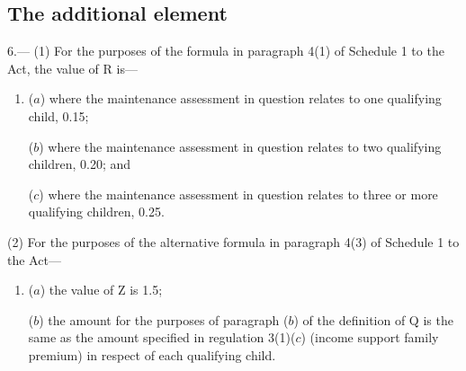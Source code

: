 \documentclass[12pt,a4paper]{article}
\begin{document}
\subsection[6. The additional element]{The additional element}

6.—%
(1) For the purposes of the formula in paragraph 4(1) of Schedule 1 to the Act, the value of R is—
\begin{enumerate}\item[]
($a$) where the maintenance assessment in question relates to one qualifying child, 0.15;

($b$) where the maintenance assessment in question relates to two qualifying children, 0.20; and

($c$) where the maintenance assessment in question relates to three or more qualifying children, 0.25.
\end{enumerate}%

(2) For the purposes of the alternative formula in paragraph 4(3) of Schedule 1 to the Act—
\begin{enumerate}\item[]
($a$) the value of Z is 
1.5;  %

($b$) the amount for the purposes of paragraph ($b$) of the definition of Q is the same as the amount specified in 
regulation 
  3(1)($c$)  %
(income support family premium) in respect of each qualifying child.
\end{enumerate}

\end{document}
